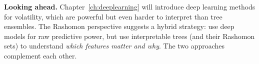 \textbf{Looking ahead.}  Chapter~\ref{ch:deeplearning} will introduce deep
learning methods for volatility, which are powerful but even harder to
interpret than tree ensembles.  The Rashomon perspective suggests a hybrid
strategy: use deep models for raw predictive power, but use interpretable
trees (and their Rashomon sets) to understand \emph{which features matter
and why}.  The two approaches complement each other.
